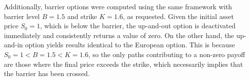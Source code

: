 \bigskip

Additionally, barrier options were computed using the same framework with barrier level \(B = 1.5\) and strike \(K = 1.6\), as requested. Given the initial asset price \(S_0 = 1\), which is below the barrier, the up-and-out option is deactivated immediately and consistently returns a value of zero. On the other hand, the up-and-in option yields results identical to the European option. This is because \(S_0 = 1 < B = 1.5 < K = 1.6\), so the only paths contributing to a non-zero payoff are those where the final price exceeds the strike, which necessarily implies that the barrier has been crossed.

